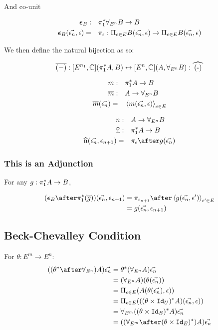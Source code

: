 \documentclass{report}
\begin{document}
And co-unit


\begin{align}
    \boldsymbol{\epsilon}_{B} : &\quad \pi_1^*\forall_{E^n} B \rightarrow B\\
    \boldsymbol{\epsilon}_{B}(\vec{\epsilon_n}, \epsilon) =&\quad \pi_\epsilon : \Pi_{e\in E}B(\vec{\epsilon_n}, \epsilon)\rightarrow \Pi_{e\in E}B(\vec{\epsilon_n}, \epsilon)
\end{align}


We then define the natural bijection as so:

\begin{equation}
    \bar{(-)}: [E^{n_1}, \C](\pstar A, B) \leftrightarrow [E^n,\C] (A, \allEn B): \widehat{(-)}
\end{equation}

\begin{align}
    m:&\quad \pi_1^* A \rightarrow B\\
    \overline{m}:&\quad A\rightarrow \forall_{E^n} B\\
    \overline{m}(\vec{\epsilon_n}) =&\quad \left\langle m(\vec{\epsilon_n}, \epsilon)\right\rangle_{e\in E}
\end{align}


\begin{align}
    n:&\quad A \rightarrow \allEn B\\
    \widehat{n}:&\quad \pstar A\rightarrow B\\
    \widehat{n}(\env, \e_{n+1}) =&\quad\pi_\e\after g(\env)
\end{align}

\subsubsection{This is an Adjunction}
For any $g: \pi_1^* A \rightarrow B$,

\begin{align}
    (\counit{B}\after\pstar(\bar{g}))(\env, \e_{n+1}) & = \pi_{\e_{n+1}}\after\finpr{g(\env, \e')}{\e'\in E}\\
    &= g(\env, \e_{n+1})
\end{align}

\subsection{Beck-Chevalley Condition}

For $\theta: E^m \rightarrow E^n$:
\begin{align}
    ((\theta\star\after\allEn)A)\env &= \theta\star(\allEn A)\env\\
    &= (\allEn A)(\theta(\env))\\
    &= \Pi_{\e\in E}(A(\theta(\env), \e))\\
    &= \Pi_{\e\in E}(((\theta\times \Id{U})\star A)(\env, \e))\\
    &= \allEm((\theta\times\Id{E})\star A)\env\\
    &= ((\allEm\after(\theta\times\Id{E})\star)A)\env
\end{align}
\end{document}
